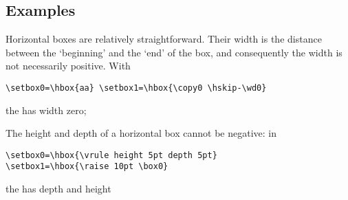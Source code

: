 \documentclass{book}
\begin{document}
\subsection{Examples}

Horizontal boxes are relatively straightforward. Their width is the
distance between the `beginning' and the `end' of the
box,
and consequently the width is not necessarily positive.
With
\begin{verbatim}
\setbox0=\hbox{aa} \setbox1=\hbox{\copy0 \hskip-\wd0}
\end{verbatim}
the  has width zero;
The height and depth of a horizontal box cannot be negative: in
\begin{verbatim}
\setbox0=\hbox{\vrule height 5pt depth 5pt}
\setbox1=\hbox{\raise 10pt \box0}
\end{verbatim}
the  has depth \n{0pt} and height~\n{15pt}
\end{document}
